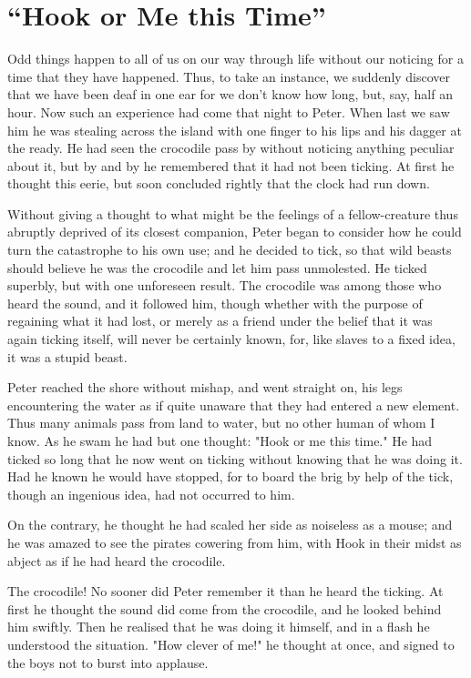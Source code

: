 
\chapter{“Hook or Me this Time”}

Odd things happen to all of us on our way through life
without our noticing for a time that they have happened.
Thus, to take an instance,
we suddenly discover that we have been deaf in one ear for we don't know how long, but, say, half an hour.
Now such an experience had come that night to Peter.
When last we saw him he was stealing across the island
with one finger to his lips and his dagger at the ready.
He had seen the crocodile pass by without noticing anything peculiar about it,
but by and by he remembered that it had not been ticking.
At first he thought this eerie,
but soon concluded rightly that the clock had run down.

Without giving a thought to what might be the feelings
of a fellow-creature thus abruptly deprived of its closest companion,
Peter began to consider how he could turn the catastrophe to his own use;
and he decided to tick, so that wild beasts should believe he was the crocodile and let him pass unmolested.
He ticked superbly, but with one unforeseen result.
The crocodile was among those who heard the sound, and it followed him,
though whether with the purpose of regaining what it had lost,
or merely as a friend under the belief that it was again ticking itself,
will never be certainly known, for, like slaves to a fixed idea, it was a stupid beast.

Peter reached the shore without mishap, and went straight on,
his legs encountering the water as if quite unaware that they had entered a new element.
Thus many animals pass from land to water, but no other human of whom I know.
As he swam he had but one thought:
"Hook or me this time."
He had ticked so long that he now went on ticking without knowing that he was doing it.
Had he known he would have stopped,
for to board the brig by help of the tick, though an ingenious idea, had not occurred to him.

On the contrary, he thought he had scaled her side as noiseless as a mouse;
and he was amazed to see the pirates cowering from him,
with Hook in their midst as abject as if he had heard the crocodile.

The crocodile!
No sooner did Peter remember it than he heard the ticking.
At first he thought the sound did come from the crocodile, and he looked behind him swiftly.
Then he realised that he was doing it himself, and in a flash he understood the situation.
"How clever of me!\@" he thought at once, and signed to the boys not to burst into applause.

